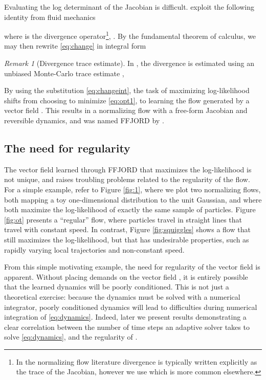 \documentclass{article}
\theoremstyle{definition}
\theoremstyle{remark}
\newtheorem{remark}[theorem]{Remark}
\begin{document}
Evaluating the log determinant of the Jacobian is difficult. 
\citet{grathwohl_ffjord} exploit the following identity 
from fluid mechanics \citep[p 114]{villani2003topics}

where  is the divergence operator\footnote{In the normalizing flow literature divergence is typically written explicitly as the trace of the Jacobian, however we use  which is more common elsewhere.}, .
By the fundamental theorem of calculus, we may then rewrite \eqref{eq:change} in integral form

\begin{remark}[Divergence trace estimate]In \citep{grathwohl_ffjord}, the divergence
  is estimated using an unbiased Monte-Carlo trace
estimate \citep{hutchinson1990stochastic,avrom11}, 

\end{remark}
By using the substitution \eqref{eq:changeint}, the task of maximizing log-likelihood shifts from
choosing  to minimize \eqref{eq:opt1}, to learning the flow generated by
a vector field . This results in a normalizing flow with a free-form Jacobian
and
reversible dynamics, and was
named FFJORD by \citeauthor{grathwohl_ffjord}.


\subsection{The need for regularity}
The vector field learned through FFJORD that maximizes the
log-likelihood is not unique, and raises troubling problems related to the
regularity of the flow. For a simple example, refer to Figure \ref{fig:1}, where
we plot two normalizing flows, both mapping a toy one-dimensional distribution
to the unit Gaussian, and where both maximize the log-likelihood of exactly the
same sample of particles. Figure \ref{fig:ot} presents a ``regular'' flow, where
particles travel in straight lines that travel with constant speed. In contrast,
Figure \ref{fig:squiggles} shows a flow that still maximizes the log-likelihood,
but that has undesirable properties, such as rapidly varying local trajectories
and non-constant speed.

From this simple motivating example, the need for regularity of the vector field
is apparent. Without placing demands on the vector field , it is entirely
possible that the learned dynamics will be poorly conditioned. This is not just
a theoretical exercise: because the dynamics must be solved with a numerical
integrator, poorly conditioned dynamics will lead to difficulties during
numerical integration of \eqref{eq:dynamics}. Indeed, later we present results
demonstrating a clear correlation between the number of time steps an adaptive
solver takes to solve \eqref{eq:dynamics}, and the regularity of .
\end{document}
